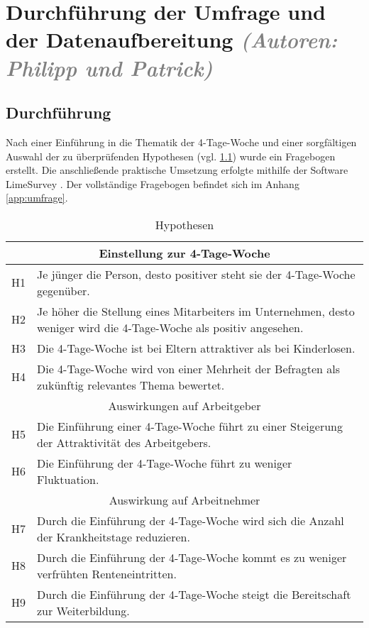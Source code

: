 \chapter{Durchführung der Umfrage und der Datenaufbereitung \textit{\textcolor{gray}{(Autoren: Philipp und Patrick)}}}


 
\section{Durchführung}

Nach einer Einführung in die Thematik der 4-Tage-Woche und einer sorgfältigen Auswahl der zu 
überprüfenden Hypothesen (vgl. \ref{tab:hyptothesen}) wurde ein Fragebogen erstellt.
Die anschließende praktische Umsetzung erfolgte mithilfe der Software LimeSurvey 
\parencite[vgl.][]{limesurvey_gmbh_limesurvey_nodate}. Der vollständige Fragebogen befindet sich im Anhang \ref{app:umfrage}.

\begin{table}[h]
    \centering
      \begin{tabular}{|l|p{}|}
      \hline
      \multicolumn{2}{|c|}{Einstellung zur 4-Tage-Woche} \\ \hline
      H1 & Je jünger die Person, desto positiver steht sie der 4-Tage-Woche gegenüber. \\ \hline
      H2 & Je höher die Stellung eines Mitarbeiters im Unternehmen, desto weniger wird die 4-Tage-Woche als positiv angesehen. \\ \hline
      H3 & Die 4-Tage-Woche ist bei Eltern attraktiver als bei Kinderlosen. \\ \hline
      H4 & Die 4-Tage-Woche wird von einer Mehrheit der Befragten als zukünftig relevantes Thema bewertet. \\ \hline
      \multicolumn{2}{|c|}{Auswirkungen auf Arbeitgeber} \\ \hline
      H5 & Die Einführung einer 4-Tage-Woche führt zu einer Steigerung der Attraktivität des Arbeitgebers. \\ \hline
      H6 & Die Einführung der 4-Tage-Woche führt zu weniger Fluktuation. \\ \hline
      \multicolumn{2}{|c|}{Auswirkung auf Arbeitnehmer} \\ \hline
      H7 & Durch die Einführung der 4-Tage-Woche wird sich die Anzahl der Krankheitstage reduzieren. \\ \hline
      H8 & Durch die Einführung der 4-Tage-Woche kommt es zu weniger verfrühten Renteneintritten. \\ \hline
      H9 & Durch die Einführung der 4-Tage-Woche steigt die Bereitschaft zur Weiterbildung. \\ \hline
      \end{tabular}
      \caption{Hypothesen}
      \label{tab:hyptothesen}
\end{table}

